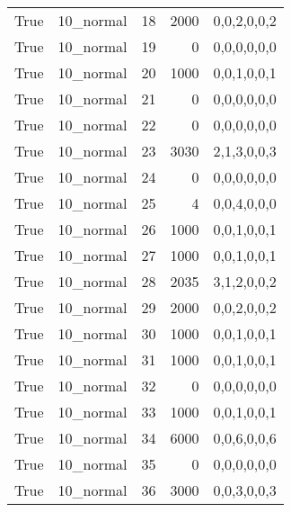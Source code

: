 \begin{tabular}{llrrl}
 True            & 10\_normal           &            18 &                  2000 & 0,0,2,0,0,2   \\
 True            & 10\_normal           &            19 &                     0 & 0,0,0,0,0,0   \\
 True            & 10\_normal           &            20 &                  1000 & 0,0,1,0,0,1   \\
 True            & 10\_normal           &            21 &                     0 & 0,0,0,0,0,0   \\
 True            & 10\_normal           &            22 &                     0 & 0,0,0,0,0,0   \\
 True            & 10\_normal           &            23 &                  3030 & 2,1,3,0,0,3   \\
 True            & 10\_normal           &            24 &                     0 & 0,0,0,0,0,0   \\
 True            & 10\_normal           &            25 &                     4 & 0,0,4,0,0,0   \\
 True            & 10\_normal           &            26 &                  1000 & 0,0,1,0,0,1   \\
 True            & 10\_normal           &            27 &                  1000 & 0,0,1,0,0,1   \\
 True            & 10\_normal           &            28 &                  2035 & 3,1,2,0,0,2   \\
 True            & 10\_normal           &            29 &                  2000 & 0,0,2,0,0,2   \\
 True            & 10\_normal           &            30 &                  1000 & 0,0,1,0,0,1   \\
 True            & 10\_normal           &            31 &                  1000 & 0,0,1,0,0,1   \\
 True            & 10\_normal           &            32 &                     0 & 0,0,0,0,0,0   \\
 True            & 10\_normal           &            33 &                  1000 & 0,0,1,0,0,1   \\
 True            & 10\_normal           &            34 &                  6000 & 0,0,6,0,0,6   \\
 True            & 10\_normal           &            35 &                     0 & 0,0,0,0,0,0   \\
 True            & 10\_normal           &            36 &                  3000 & 0,0,3,0,0,3   \\

\end{tabular}

